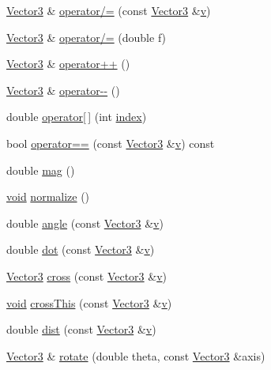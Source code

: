 \begin{DoxyCompactItemize}
\hyperlink{class_vector3}{Vector3} \& \hyperlink{class_vector3_ad28b76c61257badf6f9480e294c80e06}{operator/=} (const \hyperlink{class_vector3}{Vector3} \&\hyperlink{gl3_8h_a14cfbe2fc2234f5504618905b69d1e06}{v})
\item 
\hyperlink{class_vector3}{Vector3} \& \hyperlink{class_vector3_ab234b3dcf661eabde1a5368bc6a1e939}{operator/=} (double f)
\item 
\hyperlink{class_vector3}{Vector3} \& \hyperlink{class_vector3_a39803eb3719ea203d828bb26a5c19999}{operator++} ()
\item 
\hyperlink{class_vector3}{Vector3} \& \hyperlink{class_vector3_a2ce8b2c7a59bbc61c2f468b8e5ee8136}{operator-\/-\/} ()
\item 
double \hyperlink{class_vector3_a41371c19335a2b41f565e0dcf5d30aa2}{operator\mbox{[}$\,$\mbox{]}} (int \hyperlink{gl3_8h_a57f14e05b1900f16a2da82ade47d0c6d}{index})
\item 
bool \hyperlink{class_vector3_a684d974559c22f3fffdcc663b670b868}{operator==} (const \hyperlink{class_vector3}{Vector3} \&\hyperlink{gl3_8h_a14cfbe2fc2234f5504618905b69d1e06}{v}) const 
\item 
double \hyperlink{class_vector3_a22fd55d826ef5160851d7188d2f6db9b}{mag} ()
\item 
\hyperlink{glutf90_8h_ac778d6f63f1aaf8ebda0ce6ac821b56e}{void} \hyperlink{class_vector3_a27f9aa009d2bc1bcb04b0ec131808e4e}{normalize} ()
\item 
double \hyperlink{class_vector3_a0f12d551c4d051507ae0c88dc6765198}{angle} (const \hyperlink{class_vector3}{Vector3} \&\hyperlink{gl3_8h_a14cfbe2fc2234f5504618905b69d1e06}{v})
\item 
double \hyperlink{class_vector3_af533d5da2a49df3c19a1046a20565707}{dot} (const \hyperlink{class_vector3}{Vector3} \&\hyperlink{gl3_8h_a14cfbe2fc2234f5504618905b69d1e06}{v})
\item 
\hyperlink{class_vector3}{Vector3} \hyperlink{class_vector3_ad2a9b10b8f2f2781005cd75d0298484e}{cross} (const \hyperlink{class_vector3}{Vector3} \&\hyperlink{gl3_8h_a14cfbe2fc2234f5504618905b69d1e06}{v})
\item 
\hyperlink{glutf90_8h_ac778d6f63f1aaf8ebda0ce6ac821b56e}{void} \hyperlink{class_vector3_ab1567207b84c2f773c949eaf5de7c0c3}{cross\-This} (const \hyperlink{class_vector3}{Vector3} \&\hyperlink{gl3_8h_a14cfbe2fc2234f5504618905b69d1e06}{v})
\item 
double \hyperlink{class_vector3_a2cc9e80bdae8582ebd003fe0d15d2a38}{dist} (const \hyperlink{class_vector3}{Vector3} \&\hyperlink{gl3_8h_a14cfbe2fc2234f5504618905b69d1e06}{v})
\item 
\hyperlink{class_vector3}{Vector3} \& \hyperlink{class_vector3_af9d6bad195eab03996d30bf6635c8b29}{rotate} (double theta, const \hyperlink{class_vector3}{Vector3} \&axis)
\end{DoxyCompactItemize}

